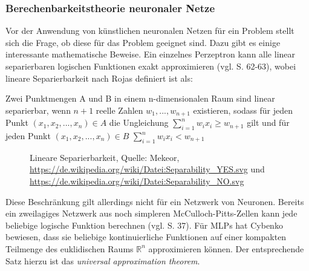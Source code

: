 \documentclass[
	12pt,
	a4paper,
	BCOR10mm,
	DIV14,
	listof=totoc,
	bibliography=totoc,
	headsepline
]{scrreprt}
\begin{document}
\subsubsection{Berechenbarkeitstheorie neuronaler Netze}
Vor der Anwendung von künstlichen neuronalen Netzen für ein Problem stellt sich die Frage, ob diese für das Problem geeignet sind. Dazu gibt es einige interessante mathematische Beweise.
Ein einzelnes Perzeptron kann alle linear separierbaren logischen Funktionen exakt approximieren (vgl. \cite{Rojas:1996:NNS:235222} S. 62-63), wobei lineare Separierbarkeit nach Rojas definiert ist als:

Zwei Punktmengen A und B in einem n-dimensionalen Raum sind linear separierbar, wenn $n + 1$ reelle Zahlen $w_1,...,w_{n+1}$ existieren, sodass für jeden Punkt $(x_1,x_2,...,x_n) \in A$ die Ungleichung $\sum_{i=1}^{n} w_ix_i \ge w_{n+1}$ gilt und für jeden Punkt $(x_1,x_2,...,x_n) \in B$ $\sum_{i=1}^{n} w_ix_i < w_{n+1}$

\begin{figure}
	\centering
	\hfill
	\caption{Lineare Separierbarkeit, Quelle: Mekeor, \url{https://de.wikipedia.org/wiki/Datei:Separability_YES.svg} und \url{https://de.wikipedia.org/wiki/Datei:Separability_NO.svg}}
	\label{fig:separierbarkeit}
\end{figure} 

Diese Beschränkung gilt allerdings nicht für ein Netzwerk von Neuronen. Bereits ein zweilagiges Netzwerk aus noch simpleren McCulloch-Pitts-Zellen kann jede beliebige logische Funktion berechnen (vgl. \cite{Rojas:1996:NNS:235222} S. 37).
Für MLPs hat Cybenko \cite{cybenko:mcss} bewiesen, dass sie beliebige kontinuierliche Funktionen auf einer kompakten Teilmenge des euklidischen Raums $\mathbb{R}^n$ approximieren können. Der entsprechende Satz hierzu ist das \textit{universal approximation theorem}.
\end{document}
